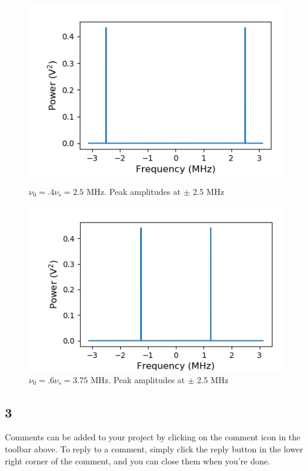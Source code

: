 \documentclass[a4paper]{article}
\begin{document}
\begin{figure}
\centering
\begin{minipage}{.5\textwidth}
	\centering
	\includegraphics[width=.8\linewidth]{5-2_pow4}
	\caption{$\nu_0 = .4 \nu_s = 2.5$ MHz. Peak amplitudes at $\pm$ 2.5 MHz}
	\label{fig:NyPw2}
\end{minipage}%
\begin{minipage}{.5\textwidth}
	\centering
	\includegraphics[width=.8\linewidth]{5-2_pow6}
	\caption{$\nu_0 = .6 \nu_s = 3.75$ MHz. Peak amplitudes at $\pm$ 2.5 MHz}
	\label{fig:NyPw8}
\end{minipage}
\end{figure}

\subsection{3}

Comments can be added to your project by clicking on the comment icon in the toolbar above. %
%
%
To reply to a comment, simply click the reply button in the lower right corner of the comment, and you can close them when you're done.
\end{document}
